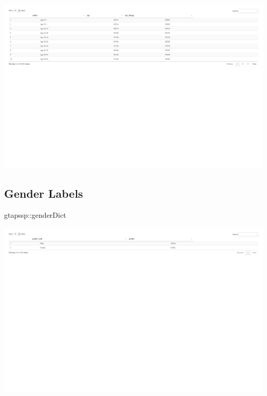 \documentclass[
  letterpaper,
  DIV=11,
  numbers=noendperiod]{scrartcl}
\newenvironment{Shaded}{}{}
\newcommand{\NormalTok}[1]{\textcolor[rgb]{0.12,0.11,0.11}{#1}}
\newcommand{\SpecialCharTok}[1]{\textcolor[rgb]{0.24,0.68,0.91}{#1}}
\begin{document}
\includegraphics{index_files/figure-pdf/unnamed-chunk-20-1.pdf}

\subsection{Gender Labels}

\begin{Shaded}
\begin{Highlighting}[]
\NormalTok{gtapssp}\SpecialCharTok{::}\NormalTok{genderDict}
\end{Highlighting}
\end{Shaded}

\includegraphics{index_files/figure-pdf/unnamed-chunk-22-1.pdf}
\end{document}
